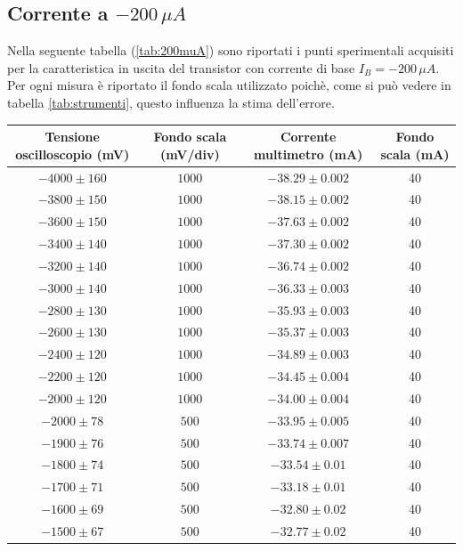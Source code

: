 \documentclass[]{article}
\begin{document}
\subsection{Corrente a $ -200\,\mu A $}
Nella seguente tabella (\ref{tab:200muA}) sono riportati i punti sperimentali acquisiti per la caratteristica in uscita del transistor con corrente di base $ I_{B}= -200\,\mu A $. Per ogni misura è riportato il fondo scala utilizzato poichè, come si può vedere in tabella \ref{tab:strumenti}, questo influenza la stima dell'errore.
	\begin{table}[H]
		\centering
	\begin{tabular}{|c|c|c|c|}
		\hline
		Tensione oscilloscopio (mV)& Fondo scala (mV/div) & Corrente multimetro (mA) &Fondo scala (mA)\\
		\hline
		$ -4000\pm 160 $ &$ 1000 $ & $ -38.29\pm 0.002 $ &40\\
		\hline
		$-3800\pm150 $ &$ 1000 $ & $ -38.15\pm0.002 $ &40 \\
		\hline
		$ -3600\pm 150 $ &$ 1000 $ & $ -37.63\pm 0.002 $ &40 \\
		\hline
		$ -3400\pm 140 $ &$ 1000 $ & $ -37.30\pm 0.002 $ &40 \\
		\hline
		$ -3200\pm 140 $ &$ 1000 $ & $-36.74\pm 0.002$ &40 \\
		\hline
		$ -3000\pm 140 $ &$ 1000 $ & $ -36.33\pm 0.003 $ &40 \\
		\hline
		$ -2800\pm 130 $ &$ 1000 $ & $ -35.93\pm 0.003 $ &40 \\
		\hline
		$ -2600\pm 130 $ &$ 1000 $ & $ -35.37\pm 0.003 $ &40 \\
		\hline
		$ -2400\pm 120 $ &$ 1000 $ & $ -34.89\pm 0.003 $ &40 \\
		\hline
		$ -2200\pm 120 $ &$ 1000 $ & $ -34.45\pm 0.004 $ &40 \\
		\hline
		$ -2000\pm 120 $ &$ 1000 $ & $ -34.00\pm0.004 $  &40\\
		\hline
		$ -2000\pm 78 $ &$ 500 $ & $ -33.95\pm0.005 $  &40\\
		\hline
		$ -1900\pm 76 $ &$ 500 $ & $ -33.74\pm0.007 $  &40\\
		\hline
		$ -1800\pm 74 $ &$ 500 $ & $ -33.54\pm 0.01 $ &40 \\
		\hline
		$ -1700\pm 71 $ &$ 500 $ & $ -33.18\pm 0.01 $ &40 \\
		\hline
		$ -1600\pm 69 $ &$ 500 $ & $ -32.80\pm 0.02 $ &40 \\
		\hline
		$ -1500\pm 67 $ &$ 500 $ & $ -32.77\pm 0.02 $ &40 \\

\end{tabular}
\end{table}
\end{document}
